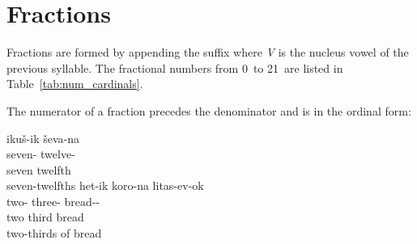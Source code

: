 \documentclass[grammar]{subfiles}
\begin{document}
  \section{Fractions}
  \label{sec:num_fractions}

  Fractions are formed by appending the suffix  where \textit{V} is the nucleus vowel of the previous syllable.  The fractional numbers from 0\dec\ to 21\dec\ are listed in Table~\ref{tab:num_cardinals}.

  \begin{table}[htpb]\small\capstart
      \qquad
      \caption{Fractional numerals from 0\dec\ to 23\dec\label{tab:num_fractional}}
  \end{table}

  \newpage
  The numerator of a fraction precedes the denominator and is in the ordinal form:

  \begin{exe}
    \ex
    \begin{xlist}
      \ex {}
      \glll ikuš-ik ševa-na\\
      seven-{\Ord} twelve-{\Frac}\\
      seven twelfth\\
      \glt seven-twelfths
      \ex {}
      \glll het-ik koro-na litas-ev-ok\\
      two-{\Ord} three-{\Frac} bread-{\Du}-{\Gen}\\
      two third bread\\
      \glt two-thirds of bread
    \end{xlist}
  \end{exe}
\end{document}
